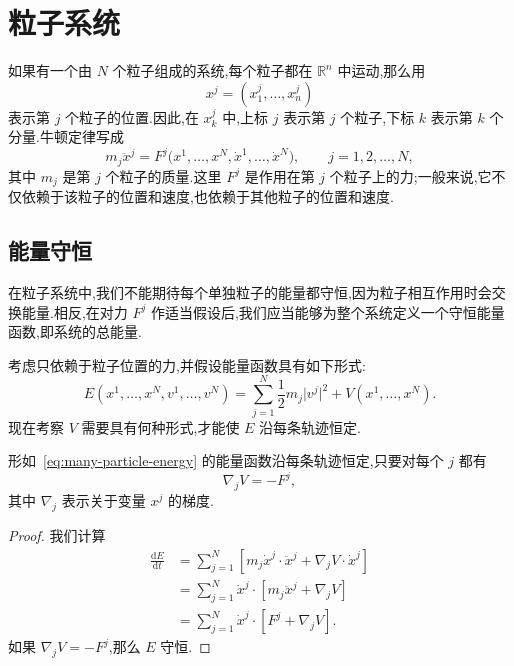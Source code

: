 \section{粒子系统}\label{sec:particle-systems}

如果有一个由 $N$ 个粒子组成的系统,每个粒子都在 $\mathbb{R}^{n}$ 中运动,那么用
\[
  x^{j}=(x^{j}_{1},\ldots,x^{j}_{n})
\]
表示第 $j$ 个粒子的位置.因此,在 $x^{j}_{k}$ 中,上标 $j$ 表示第 $j$ 个粒子,下标 $k$ 表示第 $k$ 个分量.牛顿定律写成
\[
  m_{j}\ddot{x}^{j}=F^{j}\bigl(x^{1},\ldots,x^{N},\dot{x}^{1},\ldots,\dot{x}^{N}\bigr),
  \qquad j=1,2,\ldots,N,
\]
其中 $m_{j}$ 是第 $j$ 个粒子的质量.这里 $F^{j}$ 是作用在第 $j$ 个粒子上的力;一般来说,它不仅依赖于该粒子的位置和速度,也依赖于其他粒子的位置和速度.

\subsection{能量守恒}

在粒子系统中,我们不能期待每个单独粒子的能量都守恒,因为粒子相互作用时会交换能量.相反,在对力 $F^{j}$ 作适当假设后,我们应当能够为整个系统定义一个守恒能量函数,即系统的总能量.

考虑只依赖于粒子位置的力,并假设能量函数具有如下形式:
\begin{equation}
  E(x^{1},\ldots,x^{N},v^{1},\ldots,v^{N})
  =\sum_{j=1}^{N}\frac12m_{j}\lvert v^{j}\rvert^{2}+V(x^{1},\ldots,x^{N}).
  \label{eq:many-particle-energy}
\end{equation}
现在考察 $V$ 需要具有何种形式,才能使 $E$ 沿每条轨迹恒定.

\begin{proposition}[粒子系统的能量守恒]\label{pro:many-particle-energy}
形如~\eqref{eq:many-particle-energy} 的能量函数沿每条轨迹恒定,只要对每个 $j$ 都有
\begin{equation}
  \nabla_{j}V=-F^{j},
  \label{eq:many-particle-potential}
\end{equation}
其中 $\nabla_{j}$ 表示关于变量 $x^{j}$ 的梯度.
\end{proposition}

\begin{proof}
我们计算
\begin{align*}
\frac{\mathrm{d}E}{\mathrm{d}t}
 &=\sum_{j=1}^{N}\left[m_{j}\dot{x}^{j}\cdot\ddot{x}^{j}+\nabla_{j}V\cdot\dot{x}^{j}\right]\\
 &=\sum_{j=1}^{N}\dot{x}^{j}\cdot\left[m_{j}\ddot{x}^{j}+\nabla_{j}V\right]\\
 &=\sum_{j=1}^{N}\dot{x}^{j}\cdot\left[F^{j}+\nabla_{j}V\right].
\end{align*}
如果 $\nabla_{j}V=-F^{j}$,那么 $E$ 守恒.
\end{proof}

